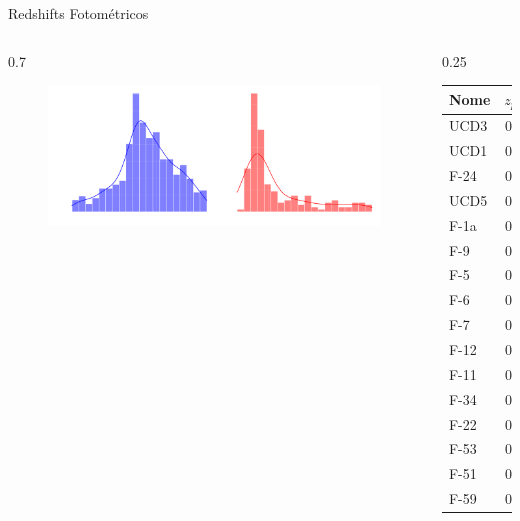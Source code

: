 \begin{frame}[c]{Redshifts Fotométricos}
    \begin{columns}[c]
        \begin{column}{0.7\linewidth}
            \begin{figure}
                \includegraphics[width=\linewidth]{images/z_zml_distribution.png}
            \end{figure}
        \end{column}
        \begin{column}{0.25\linewidth}
            \begin{table}[!ht]
                \centering
                \scriptsize
                \begin{tabular}{lccc}
                    \toprule
                    Nome & \textit{$z_{phot}$} & \textit{zml} & \textit{$z_{spec}$}\\
                    \midrule
                    UCD3 & 0.07 & 0.03 & 0.0053\\
                    UCD1 & 0.09 & 0.08 & 0.0052\\
                    F-24 & 0.08 & 0.04 & 0.0062\\
                    UCD5 & 0.03 & 0.04 & 0.0045\\
                    F-1a & 0.21 & -- & 0.0042\\
                    F-9 & 0.09 & 0.07 & 0.0058\\
                    F-5 & 0.06 & -- & 0.0057\\
                    F-6 & 0.10 & -- & 0.0037\\
                    F-7 & 0.19 & 0.16 & 0.0050\\
                    F-12 & 0.07 & -- & 0.0055\\
                    F-11 & 0.10 & -- & 0.0059\\
                    F-34 & 0.07 & -- & 0.0054\\ 
                    F-22 & 0.09 & 0.06 & 0.0034\\
                    F-53 & 0.31 & -- & 0.0020\\
                    F-51 & 0.10 & -- & 0.0041\\
                    F-59 & 0.06 & -- & 0.0060\\
                    \midrule
                \end{tabular}
            \end{table}
        \end{column}
    \end{columns}
\end{frame}




